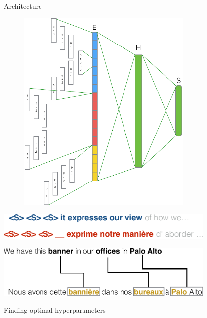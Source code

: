 \documentclass[dvipsnames,a0paper,portrait]{baposter}
\begin{document}
\begin{poster}
\begin{posterbox}[name=decoding,column=0,below=motivation]{Architecture}
\begin{center}
\includegraphics[width=0.8\textwidth,height=10cm]{figures/nnarchitecture.pdf}
\end{center}

\begin{center}
\includegraphics[width=0.8\textwidth]{figures/contextexample.pdf}
\end{center}

\begin{center}
\includegraphics[width=0.8\textwidth]{figures/posexample.pdf}
\end{center}

\end{posterbox}


\begin{posterbox}[name=cohesion,column=1,aligned=motivation]{Finding optimal hyperparameters}
\raggedright



\end{posterbox}
\end{poster}
\end{document}

